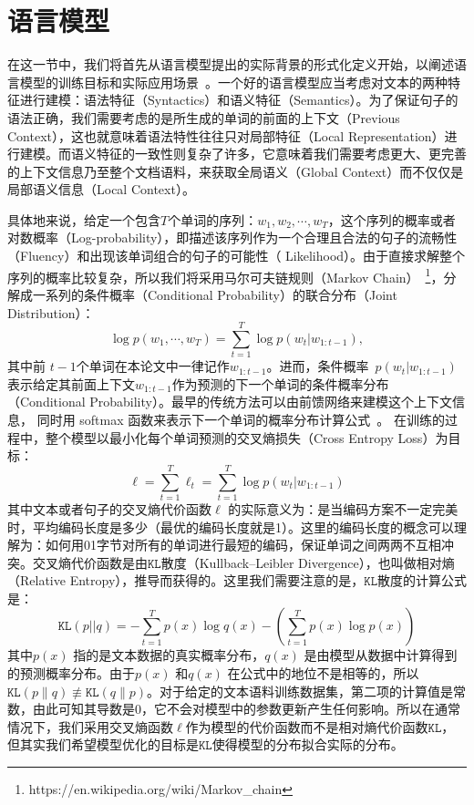 \section{语言模型}
在这一节中，我们将首先从语言模型提出的实际背景的形式化定义开始，以阐述语言模型的训练目标和实际应用场景~。一个好的语言模型应当考虑对文本的两种特征进行建模：语法特征（Syntactics）和语义特征（Semantics）。为了保证句子的语法正确，我们需要考虑的是所生成的单词的前面的上下文（Previous Context），这也就意味着语法特性往往只对局部特征（Local Representation）进行建模。而语义特征的一致性则复杂了许多，它意味着我们需要考虑更大、更完善的上下文信息乃至整个文档语料，来获取全局语义（Global Context）而不仅仅是局部语义信息（Local Context）。


具体地来说，给定一个包含$T$个单词的序列：$w_1,w_2,\cdots,w_T$，这个序列的概率或者对数概率（Log-probability），即描述该序列作为一个合理且合法的句子的流畅性（Fluency）和出现该单词组合的句子的可能性（ Likelihood）。由于直接求解整个序列的概率比较复杂，所以我们将采用马尔可夫链规则（Markov Chain）~\footnote{https://en.wikipedia.org/wiki/Markov\_chain}，分解成一系列的条件概率（Conditional Probability）的联合分布（Joint Distribution）：
\begin{equation}
\label{laguage_model}
 \log p(w_1,\cdots, w_T ) = \sum_{t=1}^T \log p(w_t | w_{1:t-1}),
\end{equation}
其中前 $t-1$个单词在本论文中一律记作$w_ {1:t-1}$。进而，条件概率~$p(w_t | w_ {1:t-1})$表示给定其前面上下文$w_ {1:t-1} $作为预测的下一个单词的条件概率分布（Conditional Probability）。最早的传统方法可以由前馈网络来建模这个上下文信息， 同时用 softmax 函数来表示下一个单词的概率分布计算公式~。 在训练的过程中，整个模型以最小化每个单词预测的交叉熵损失（Cross Entropy Loss）为目标：
\begin{equation}\label{equ:losses2}
  \ell=\sum_{t=1}^{T}\ell_t=\sum_{t=1}^{T}\log p(w_t | w_{1:t-1})
\end{equation}
其中文本或者句子的交叉熵代价函数$\ell$ 的实际意义为：是当编码方案不一定完美时，平均编码长度是多少（最优的编码长度就是1）。这里的编码长度的概念可以理解为：如何用01字节对所有的单词进行最短的编码，保证单词之间两两不互相冲突。交叉熵代价函数是由$\texttt{KL}$散度（Kullback–Leibler Divergence），也叫做相对熵（Relative Entropy），推导而获得的。这里我们需要注意的是，$\mathtt{KL}$散度的计算公式是：
\begin{equation}\label{equ:losses}
  \mathtt{KL}(p||q)=-\sum_{t=1}^{T}p(x)\log q(x) - (\sum_{t=1}^{T}p(x)\log p(x))
\end{equation}
其中$p(x)$ 指的是文本数据的真实概率分布，$q(x)$ 是由模型从数据中计算得到的预测概率分布。由于$p(x)$ 和$q(x)$ 在公式中的地位不是相等的，所以$\texttt{KL} (p\parallel q)\not\equiv \texttt{KL}(q\parallel p)$。对于给定的文本语料训练数据集，第二项的计算值是常数，由此可知其导数是0，它不会对模型中的参数更新产生任何影响。所以在通常情况下，我们采用交叉熵函数$\ell$作为模型的代价函数而不是相对熵代价函数$\mathtt{KL}$，但其实我们希望模型优化的目标是$\mathtt{KL}$使得模型的分布拟合实际的分布。
